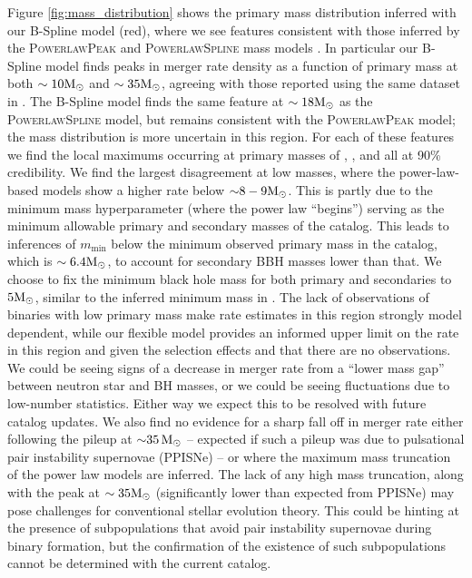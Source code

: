 Figure \ref{fig:mass_distribution} shows the primary mass distribution inferred with our B-Spline model (red), where we see features consistent with those inferred by the \textsc{PowerlawPeak} and \textsc{PowerlawSpline} mass models \citep{Talbot_2018,o3a_pop,Edelman_2022ApJ,o3b_astro_dist,gwtc3_POPDATA}. 
In particular our B-Spline model finds peaks in merger rate density as a function of primary mass at both $\sim10{\rm M}_\odot$ and $\sim35{\rm M}_\odot$, agreeing with those 
reported using the same dataset in \citet{o3b_astro_dist}.  The B-Spline model finds the same feature at $\sim18{\rm M}_\odot$ as the \textsc{PowerlawSpline} model, but remains consistent with the \textsc{PowerlawPeak} model; the mass distribution is more uncertain in this region. For each of these features we find the local maximums occurring at primary masses of \result{$\CIPlusMinus{\macros[MassDistribution][BSpline][peaks][10]}\,\msun$},  
\result{$\CIPlusMinus{\macros[MassDistribution][BSpline][peaks][18]}\,\msun$}, and  
\result{$\CIPlusMinus{\macros[MassDistribution][BSpline][peaks][35]}\,\msun$} all at 90\% credibility.
We find the largest disagreement at low masses, where the power-law-based models show a higher rate below ${\sim}8-9{\rm M}_\odot$. This is partly due to the minimum mass hyperparameter (where the power law ``begins'') serving as the minimum allowable primary and secondary masses of the catalog. This leads to inferences of $m_\mathrm{min}$ below the minimum observed primary mass in the catalog, which is $\sim 6.4{\rm M}_\odot$, to account for secondary BBH masses lower than that. We choose to fix the minimum black hole mass for both primary and secondaries to $5{\rm M}_\odot$, 
similar to the inferred minimum mass in \citet{o3b_astro_dist}. The lack of observations of binaries with low primary mass make rate estimates in this region strongly model dependent, while our flexible model provides an informed upper limit on the rate in this region and given the selection effects and that there are no observations. We could be seeing signs of a decrease in merger rate from a ``lower mass gap'' between neutron star and BH masses, or we could be seeing fluctuations due to low-number statistics.  Either way we expect this to be resolved with future catalog updates. We also find no evidence for a sharp fall off in merger rate either following 
the pileup at ${\sim}35\,{\rm M}_\odot$ -- expected if such a pileup was due to pulsational pair instability supernovae (PPISNe) -- or where the maximum mass truncation of the power law models 
are inferred. The lack of any high mass truncation, along with the peak at $\sim35{\rm M}_\odot$ (significantly lower than expected from PPISNe) may pose challenges for conventional stellar 
evolution theory. This could be hinting at the presence of subpopulations that avoid pair instability supernovae during binary formation, but the confirmation of the existence of such subpopulations 
cannot be determined with the current catalog. 

